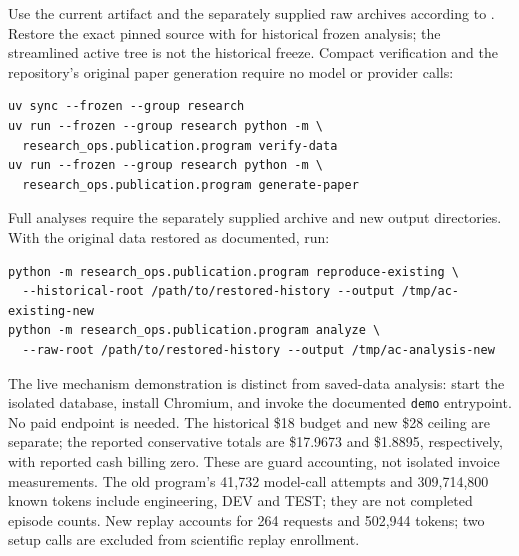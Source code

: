 \documentclass[10pt]{article}
\newcommand{\code}[1]{\texttt{#1}}
\begin{document}
Use the current artifact and the separately supplied raw archives according to . Restore the exact pinned source with  for historical frozen analysis; the streamlined active tree is not the historical freeze. Compact verification and the repository's original paper generation require no model or provider calls:
\begin{verbatim}
uv sync --frozen --group research
uv run --frozen --group research python -m \
  research_ops.publication.program verify-data
uv run --frozen --group research python -m \
  research_ops.publication.program generate-paper
\end{verbatim}
Full analyses require the separately supplied archive and new output directories. With the original data restored as documented, run:
\begin{verbatim}
python -m research_ops.publication.program reproduce-existing \
  --historical-root /path/to/restored-history --output /tmp/ac-existing-new
python -m research_ops.publication.program analyze \
  --raw-root /path/to/restored-history --output /tmp/ac-analysis-new
\end{verbatim}
The live mechanism demonstration is distinct from saved-data analysis: start the isolated database, install Chromium, and invoke the documented \code{demo} entrypoint. No paid endpoint is needed. The historical \$18 budget and new \$28 ceiling are separate; the reported conservative totals are \$17.9673 and \$1.8895, respectively, with reported cash billing zero. These are guard accounting, not isolated invoice measurements. The old program's 41,732 model-call attempts and 309,714,800 known tokens include engineering, DEV and TEST; they are not completed episode counts. New replay accounts for 264 requests and 502,944 tokens; two setup calls are excluded from scientific replay enrollment.
\end{document}
